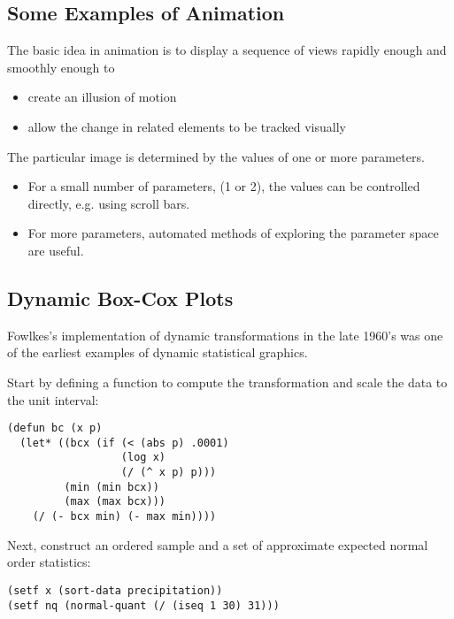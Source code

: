 \begin{slide}{}
\section{Some Examples of Animation}
The basic idea in animation is to display a sequence of views
rapidly enough and smoothly enough to
\begin{itemize}
\item create an illusion of motion
\item allow the change in related elements to be tracked visually
\end{itemize}
The particular image is determined by the values of one or more
parameters.
\begin{itemize}
\item
For a small number of parameters, (1 or 2), the values can
be controlled directly, e.g. using scroll bars.
\item
For more parameters, automated methods of exploring the parameter space
are useful.
\end{itemize}
\end{slide}

\begin{slide}{}
\subsection{Dynamic Box-Cox Plots}
Fowlkes's implementation of dynamic transformations in the late 1960's
was one of the earliest examples of dynamic statistical graphics.

Start by defining a function to compute the transformation and scale
the data to the unit interval:
{\Large
\begin{verbatim}
(defun bc (x p)
  (let* ((bcx (if (< (abs p) .0001)
                  (log x)
                  (/ (^ x p) p)))
         (min (min bcx))
         (max (max bcx)))
    (/ (- bcx min) (- max min))))
\end{verbatim}}
Next, construct an ordered sample and a set of approximate expected
normal order statistics:
{\Large
\begin{verbatim}
(setf x (sort-data precipitation))
(setf nq (normal-quant (/ (iseq 1 30) 31)))
\end{verbatim}}
\end{slide}


